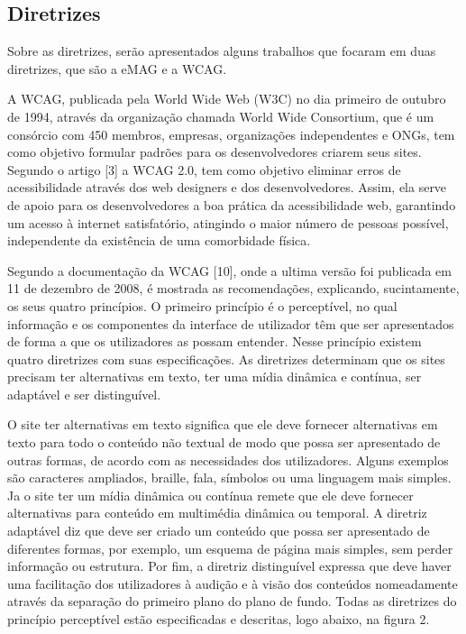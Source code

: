 \documentclass[a4paper]{article}
\begin{document}
\begin{titlepage}
\subsection{Diretrizes}
Sobre as diretrizes, serão apresentados alguns trabalhos que focaram em duas diretrizes, que são a eMAG e a WCAG. 

A WCAG, publicada pela World Wide Web (W3C) no dia primeiro de outubro de 1994, através da organização chamada World Wide Consortium, que é um consórcio com 450 membros, empresas, organizações independentes e ONGs, tem como objetivo formular padrões para os desenvolvedores criarem seus sites. Segundo o artigo [3] a WCAG 2.0, tem como objetivo eliminar erros de acessibilidade através dos web designers e dos desenvolvedores. Assim, ela serve de apoio para os desenvolvedores a boa prática da acessibilidade web, garantindo um acesso à internet satisfatório, atingindo o maior número de pessoas possível, independente da existência de uma comorbidade física.

Segundo a documentação da WCAG [10], onde a ultima versão foi publicada em 11 de dezembro de 2008, é mostrada as recomendações, explicando, sucintamente, os seus quatro princípios. O primeiro princípio é o perceptível, no qual informação e os componentes da interface de utilizador têm que ser apresentados de forma a que os utilizadores as possam entender. Nesse princípio existem quatro diretrizes com suas especificações. As diretrizes determinam que os sites precisam ter alternativas em texto, ter uma mídia dinâmica e contínua, ser adaptável e ser distinguível.

O site ter alternativas em texto significa que ele deve fornecer alternativas em texto para todo o conteúdo não textual de modo que possa ser apresentado de outras formas, de acordo com as necessidades dos utilizadores. Alguns exemplos são caracteres ampliados, braille, fala, símbolos ou uma linguagem mais simples. Ja o site ter um mídia dinâmica ou contínua remete que ele deve fornecer alternativas para conteúdo em multimédia dinâmica ou temporal. A diretriz adaptável diz que deve ser criado um conteúdo que possa ser apresentado de diferentes formas, por exemplo, um esquema de página mais simples, sem perder informação ou estrutura. Por fim, a diretriz distinguível expressa que deve haver uma facilitação dos utilizadores à audição e à visão dos conteúdos nomeadamente através da separação do primeiro plano do plano de fundo. Todas as diretrizes do princípio perceptível estão especificadas e descritas, logo abaixo, na figura 2.\\


\end{titlepage}
\end{document}
